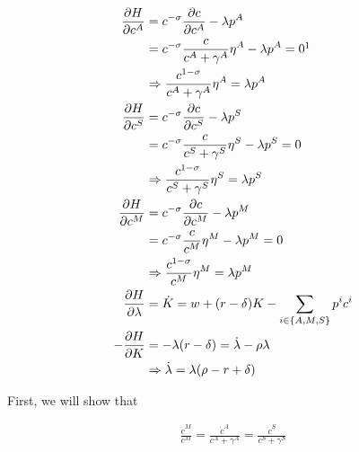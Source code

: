 \begin{align}
    \frac{\partial H}{\partial c^A} &= c^{-\sigma} \frac{\partial c}{\partial c^A} - \lambda p^A \\
    &= c^{-\sigma}\frac{c}{c^A+\gamma^A} \eta^A-\lambda p^A=0 \footnotemark \label{eq:pset_2023_24_ps2_q2_golosov_foc_cA} \\
    & \Rightarrow \frac{c^{1-\sigma}}{c^A+\gamma^A} \eta^A=\lambda p^A \label{eq:pset_2023_24_ps2_q2_golosov_foc_cA_2} \\
    \frac{\partial H}{\partial c^S} &= c^{-\sigma} \frac{\partial c}{\partial c^S} - \lambda p^S \\
    &= c^{-\sigma}\frac{c}{c^S+\gamma^S} \eta^S-\lambda p^S=0 \label{eq:pset_2023_24_ps2_q2_golosov_foc_cS} \\
    & \Rightarrow \frac{c^{1-\sigma}}{c^S+\gamma^S} \eta^S=\lambda p^S  \label{eq:pset_2023_24_ps2_q2_golosov_foc_cS_2} \\
    \frac{\partial H}{\partial c^M} &= c^{-\sigma} \frac{\partial c}{\partial c^M} - \lambda p^M \\
    &= c^{-\sigma}\frac{c}{c^M} \eta^M-\lambda p^M=0 \label{eq:pset_2023_24_ps2_q2_golosov_foc_cM} \\
    & \Rightarrow \frac{c^{1-\sigma}}{c^M} \eta^M=\lambda p^M \label{eq:pset_2023_24_ps2_q2_golosov_foc_cM_2} \\
    \frac{\partial H}{\partial \lambda} &= \dot{K} = w+(r-\delta) K -  \sum_{i \in\{A, M, S\}} p^i c^i \label{eq:pset_2023_24_ps2_q2_golosov_foc_lambda} \\
    -\frac{\partial H}{\partial K} &= -\lambda(r-\delta) = \dot{\lambda} - \rho \lambda \label{eq:pset_2023_24_ps2_q2_golosov_foc_k} \\
    & \Rightarrow \dot{\lambda} = \lambda(\rho - r +\delta ) \label{eq:pset_2023_24_ps2_q2_golosov_foc_k_2}
\end{align}


First, we will show that

\begin{align}
    \frac{\dot{c}^M}{c^M}=\frac{\dot{c}^A}{c^A+\gamma^A}=\frac{\dot{c}^S}{c^S+\gamma^S}
\end{align}

